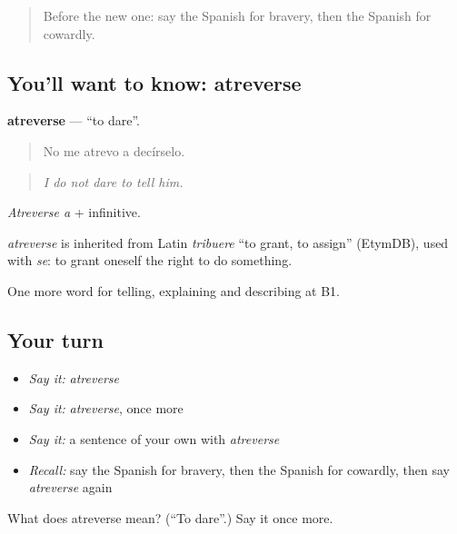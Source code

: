 \label{lesson:ES-C722-atreverse}



\begin{quote}
Before the new one: say the Spanish for bravery, then the Spanish for cowardly.
\end{quote}

\subsection*{You'll want to know: atreverse}
\textbf{atreverse} — \textquotedblleft{}to dare\textquotedblright{}.

\begin{quote}
No me atrevo a decírselo.
\end{quote}

\begin{quote}
\emph{I do not dare to tell him.}
\end{quote}

\emph{Atreverse a} + infinitive.

\begin{cousinweb}
\emph{atreverse} is inherited from Latin \emph{tribuere} \textquotedblleft{}to grant, to assign\textquotedblright{} (EtymDB), used with \emph{se}: to grant oneself the right to do something.
\end{cousinweb}

\begin{grammarlens}[title={What you've built}]
One more word for telling, explaining and describing at B1.
\end{grammarlens}

\subsection*{Your turn}
\begin{itemize}
\raggedright
  \item \emph{Say it:} \emph{atreverse}
  \item \emph{Say it:} \emph{atreverse}, once more
  \item \emph{Say it:} a sentence of your own with \emph{atreverse}
  \item \emph{Recall:} say the Spanish for bravery, then the Spanish for cowardly, then say \emph{atreverse} again
\end{itemize}

\begin{tcolorbox}[breakable,colback=teal!4,colframe=teal!35!black,title={Before you move on}]
What does atreverse mean? (\textquotedblleft{}To dare\textquotedblright{}.) Say it once more.
\end{tcolorbox}
